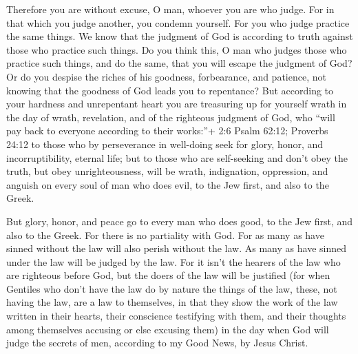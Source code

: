  Therefore you are without excuse, O man, whoever you are
who judge. For in that which you judge another, you condemn yourself.
For you who judge practice the same things.  We know that
the judgment of God is according to truth against those who practice
such things.  Do you think this, O man who judges those who
practice such things, and do the same, that you will escape the judgment
of God?  Or do you despise the riches of his goodness,
forbearance, and patience, not knowing that the goodness of God leads
you to repentance?  But according to your hardness and
unrepentant heart you are treasuring up for yourself wrath in the day of
wrath, revelation, and of the righteous judgment of God, 
who ``will pay back to everyone according to their works:''+ 2:6 Psalm
62:12; Proverbs 24:12  to those who by perseverance in
well-doing seek for glory, honor, and incorruptibility, eternal life;
 but to those who are self-seeking and don't obey the truth,
but obey unrighteousness, will be wrath, indignation, 
oppression, and anguish on every soul of man who does evil, to the Jew
first, and also to the Greek.

 But glory, honor, and peace go to every man who does good,
to the Jew first, and also to the Greek.  For there is no
partiality with God.  For as many as have sinned without
the law will also perish without the law. As many as have sinned under
the law will be judged by the law.  For it isn't the
hearers of the law who are righteous before God, but the doers of the
law will be justified  (for when Gentiles who don't have
the law do by nature the things of the law, these, not having the law,
are a law to themselves,  in that they show the work of the
law written in their hearts, their conscience testifying with them, and
their thoughts among themselves accusing or else excusing them)
 in the day when God will judge the secrets of men,
according to my Good News, by Jesus Christ.

